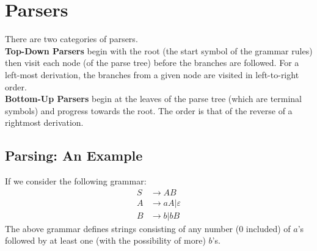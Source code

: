 \section{Parsers}
There are two categories of parsers.\\

\textbf{Top-Down Parsers} begin with the root (the start symbol of the grammar rules) then visit each node (of the parse tree) before the branches are followed. For a left-most derivation, the branches from a given node are visited in left-to-right order.\\

\textbf{Bottom-Up Parsers} begin at the leaves of the parse tree (which are terminal symbols) and progress towards the root. The order is that of the reverse of a rightmost derivation.

\subsection{Parsing: An Example}
If we consider the following grammar:
\begin{align*}
    S & \rightarrow AB\\
    A & \rightarrow aA|\varepsilon \\
    B & \rightarrow b | bB
\end{align*}
The above grammar defines strings consisting of any number (0 included) of $a$'s followed by at least one (with the possibility of more) $b$'s. \\

